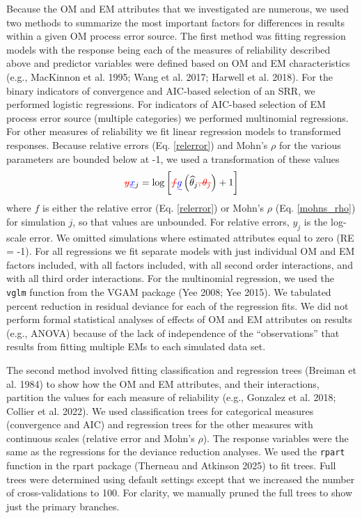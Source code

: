 \documentclass[
  12pt,
]{article}
\makeatletter
\providecommand{\DIFadd}[1]{{\protect\color{blue}\uwave{#1}}} %
\providecommand{\DIFdel}[1]{{\protect\color{red}\sout{#1}}} %
\providecommand{\DIFaddbegin}{} %
\providecommand{\DIFaddend}{} %
\providecommand{\DIFdelbegin}{} %
\providecommand{\DIFdelend}{} %
\providecommand{\DIFscaledelfig}{0.5}
\newlength{\DIFdelgraphicswidth} %
\newlength{\DIFdelgraphicsheight} %
\providecommand{\DIFaddincludegraphics}[2][]{{\color{blue}\fbox{\DIFOincludegraphics[#1]{#2}}}} %
\providecommand{\DIFdelincludegraphics}[2][]{%
\sbox{\DIFdelgraphicsbox}{\DIFOincludegraphics[#1]{#2}}%
\settoboxwidth{\DIFdelgraphicswidth}{\DIFdelgraphicsbox} %
\settoboxtotalheight{\DIFdelgraphicsheight}{\DIFdelgraphicsbox} %
\scalebox{\DIFscaledelfig}{%
\parbox[b]{\DIFdelgraphicswidth}{\usebox{\DIFdelgraphicsbox}\\[-\baselineskip] \rule{\DIFdelgraphicswidth}{0em}}\llap{\resizebox{\DIFdelgraphicswidth}{\DIFdelgraphicsheight}{%
\setlength{\unitlength}{\DIFdelgraphicswidth}%
\begin{picture}(1,1)%
\thicklines\linethickness{2pt} %
{\color[rgb]{1,0,0}\put(0,0){\framebox(1,1){}}}%
{\color[rgb]{1,0,0}\put(0,0){\line( 1,1){1}}}%
{\color[rgb]{1,0,0}\put(0,1){\line(1,-1){1}}}%
\end{picture}%
}\hspace*{3pt}}} %
} %
\DeclareRobustCommand{\DIFaddbegin}{\DIFOaddbegin \let\includegraphics\DIFaddincludegraphics} %
\DeclareRobustCommand{\DIFaddend}{\DIFOaddend \let\includegraphics\DIFOincludegraphics} %
\DeclareRobustCommand{\DIFdelbegin}{\DIFOdelbegin \let\includegraphics\DIFdelincludegraphics} %
\DeclareRobustCommand{\DIFdelend}{\DIFOaddend \let\includegraphics\DIFOincludegraphics} %
\let\sout@orig\sout %
\renewcommand{\sout}[1]{\ifmmode\text{\sout@orig{\ensuremath{#1}}}\else\sout@orig{#1}\fi} %
\makeatother
\begin{document}
Because the OM and EM attributes that we investigated are numerous, we
used two methods to summarize the most important factors for differences
in results within a given OM process error source. The first method was
fitting regression models with the response being each of the measures
of reliability described above and predictor variables were defined
based on OM and EM characteristics (e.g., MacKinnon et al. 1995; Wang et
al. 2017; Harwell et al. 2018). For the binary indicators of convergence
and AIC-based selection of an SRR, we performed logistic regressions.
For indicators of AIC-based selection of EM process error source
(multiple categories) we performed multinomial regressions. For other
measures of reliability we fit linear regression models to transformed
responses. Because relative errors (Eq. \ref{relerror}) and Mohn's
\(\rho\) for the various parameters are bounded below at -1, we used a
transformation of these values
\begin{equation}\label{bias_regression_response}
\DIFdelbegin \DIFdel{y}\DIFdelend \DIFaddbegin \DIFadd{x}\DIFaddend _j = \log\left[\DIFdelbegin \DIFdel{f}\DIFdelend \DIFaddbegin \DIFadd{g}\DIFaddend \left(\widehat \theta_j\DIFdelbegin \DIFdel{,\theta_j}\DIFdelend \right)+1\right]
\end{equation} where \DIFdelbegin \DIFdel{\(f\) }\DIFdelend \DIFaddbegin \DIFadd{\(g\left(\widehat \theta_j\right)\) }\DIFaddend is either the
relative error (Eq. \ref{relerror}) or Mohn's \(\rho\) (Eq.
\ref{mohns_rho}) for simulation \(j\), so that values are unbounded. For
relative errors, \DIFdelbegin \DIFdel{\(y_j\) }\DIFdelend \DIFaddbegin \DIFadd{\(x_j\) }\DIFaddend is the log-scale error. We omitted simulations
where estimated attributes equal to zero (RE = -1). For all regressions
we fit separate models with just individual OM and EM factors included,
with all factors included, with all second order interactions, and with
all third order interactions. For the multinomial regression, we used
the \verb|vglm| function from the VGAM package (Yee 2008; Yee 2015). We
tabulated percent reduction in residual deviance for each of the
regression fits. We did not perform formal statistical analyses of
effects of OM and EM attributes on results (e.g., ANOVA) because of the
lack of independence of the ``observations'' that results from fitting
multiple EMs to each simulated data set.

The second method involved fitting classification and regression trees
(Breiman et al. 1984) to show how the OM and EM attributes, and their
interactions, partition the values for each measure of reliability
(e.g., Gonzalez et al. 2018; Collier et al. 2022). We used
classification trees for categorical measures (convergence and AIC) and
regression trees for the other measures with continuous scales (relative
error and Mohn's \(\rho\)). The response variables were the same as the
regressions for the deviance reduction analyses. We used the
\verb|rpart| function in the rpart package (Therneau and Atkinson 2025)
to fit trees. Full trees were determined using default settings except
that we increased the number of cross-validations to 100. For clarity,
we manually pruned the full trees to show just the primary branches.
\end{document}
